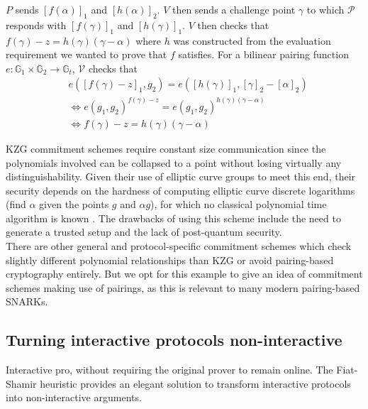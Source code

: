 $P$ sends $[f(\alpha)]_1$ and $[h(\alpha)]_2$. $V$ then sends a challenge point $\gamma$ to which $\mathcal{P}$ responds with $[f(\gamma)]_1$ and $[h(\gamma)]_1$. $V$ then checks that $f(\gamma) - z = h(\gamma)(\gamma - \alpha)$ where $h$ was constructed from the evaluation requirement we wanted to prove that $f$ satisfies. For a bilinear pairing function $e : \mathbb{G}_1 \times \mathbb{G}_2 \to \mathbb{G}_t$, $\mathcal{V}$ checks that 
\begin{align}
&e([f(\gamma) - z]_1, g_2) = e([h(\gamma)]_1, [\gamma]_2 - [\alpha]_2) \\
&\Leftrightarrow e(g_1, g_2)^{f(\gamma) - z} = e(g_1, g_2)^{h(\gamma)(\gamma - \alpha)} \\
&\Leftrightarrow  f(\gamma) - z = h(\gamma)(\gamma - \alpha)
\end{align}

\noindent KZG commitment schemes require constant size communication since the polynomials involved can be collapsed to a point without losing virtually any distinguishability. Given their use of elliptic curve groups to meet this end, their security depends on the hardness of computing elliptic curve discrete logarithms (find $\alpha$ given the points $g$ and $\alpha g$), for which no classical polynomial time algorithm is known \cite{ecdlp}. The drawbacks of using this scheme include the need to generate a trusted setup and the lack of post-quantum security.\\

\noindent There are other general and protocol-specific commitment schemes which check slightly different polynomial relationships than KZG or avoid pairing-based cryptography entirely. But we opt for this example to give an idea of commitment schemes making use of pairings, as this is relevant to many modern pairing-based SNARKs.

\subsection{Turning interactive protocols non-interactive}
 \noindent Interactive pro, without requiring the original prover to remain online. The Fiat-Shamir heuristic provides an elegant solution to transform interactive protocols into non-interactive arguments.
